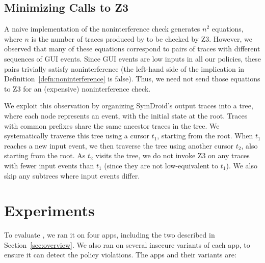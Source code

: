 \subsection{Minimizing Calls to Z3}
\label{sec:z3-tree}

A naive implementation of the noninterference check generates $n^2$
equations, where $n$ is the number of traces produced by \toolname{}
to be checked by Z3. However, we observed that many of these equations
correspond to pairs of traces with different sequences of GUI
events. Since GUI events are low inputs in all our policies, these
pairs trivially satisfy noninterference (the left-hand side of the
implication in Definition~\ref{defn:noninterference} is false).
Thus, we need not send those
equations to Z3 for an (expensive) noninterference check.

We exploit this observation by organizing SymDroid's output traces
into a tree, where each node represents an event, with
the initial state at the root. Traces with common prefixes share the
same ancestor traces in the tree. We systematically traverse this tree
using a cursor $t_1$, starting from the root. When $t_1$ reaches a new
input event, we then traverse the tree using another cursor $t_2$,
also starting from the root. As $t_2$ visits the tree, we do not
invoke Z3 on any traces with fewer input events than $t_1$ (since they
are not low-equivalent to $t_1$). We also skip any subtrees where 
input events differ.

\section{Experiments}
\label{sec:experiments}

To evaluate \toolname{}, we ran it on four apps, including the two
described in Section~\ref{sec:overview}. We also ran \toolname{} on
several insecure variants of each app, to ensure it can detect the
policy violations. The apps and their variants
are:

